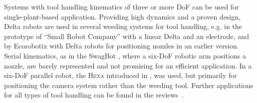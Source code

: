 \documentclass[runningheads]{llncs}
\begin{document}
Systems with tool handling kinematics of three or more DoF can be used for single-plant-based application. 
Providing high dynamics and a proven design, Delta robots are used in several weeding systems for tool handling, e.g. in the prototype of ``Small Robot Company'' \cite{SmallRobotCompany24-01-2023} with a linear Delta and an electrode, and by Ecorobotix \cite{Ecorobotix} with Delta robots for positioning nozzles in an earlier version. 
Serial kinematics, as in the SwagBot \cite{Eiffert2021}, where a six-DoF robotic arm positions a nozzle, are barely represented and not promising for an efficient application. 
In \cite{Blasco2002} a six-DoF parallel robot, the \textsc{Hexa} introduced in \cite{Pierrot1991}, was used, but primarily for positioning the camera system rather than the weeding tool. 
Further applications for all types of tool handling can be found in the reviews~\cite{Zhang2022,Fountas2020,Oliveira2021}. 
\end{document}
